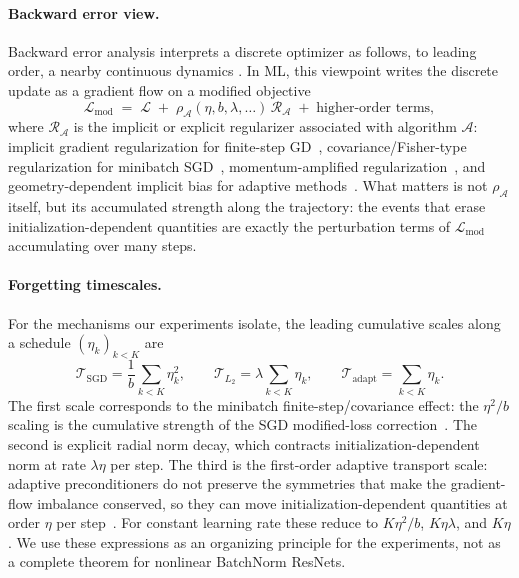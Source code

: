 \documentclass{article}
\begin{document}
\paragraph{Backward error view.}
Backward error analysis interprets a discrete optimizer as follows, to
leading order, a nearby continuous dynamics
\citep{griffiths1986scope,hairer2006geometric}.  In ML, this viewpoint writes
the discrete update as a gradient flow on a modified objective
\[
    \mathcal L_{\mathrm{mod}}
    \;=\;
    \mathcal L
    \;+\;
    \rho_{\mathcal A}(\eta,b,\lambda,\ldots)\,
    \mathcal R_{\mathcal A}
    \;+\;
    \text{higher-order terms},
\]
where $\mathcal R_{\mathcal A}$ is the implicit or explicit regularizer
associated with algorithm $\mathcal A$: implicit gradient regularization for
finite-step GD~\citep{barrett2021implicit}, covariance/Fisher-type
regularization for minibatch
SGD~\citep{smith2021origin,beneventano2023trajectories},
momentum-amplified regularization~\citep{ghosh2023implicit}, and
geometry-dependent implicit bias for adaptive
methods~\citep{cattaneo2024implicit}.  What matters is not
$\rho_{\mathcal A}$ itself, but its accumulated strength along the trajectory: the events that erase initialization-dependent quantities are exactly the
perturbation terms of $\mathcal L_{\mathrm{mod}}$ accumulating over many
steps.


\paragraph{Forgetting timescales.}
For the mechanisms our experiments isolate, the leading cumulative scales
along a schedule $(\eta_k)_{k<K}$ are
\[
    \mathcal T_{\mathrm{SGD}}
    =
    \frac{1}{b}\sum_{k<K}\eta_k^2,
    \qquad
    \mathcal T_{L_2}
    =
    \lambda\sum_{k<K}\eta_k,
    \qquad
    \mathcal T_{\mathrm{adapt}}
    =
    \sum_{k<K}\eta_k.
\]
The first scale corresponds to the minibatch finite-step/covariance effect: the $\eta^2/b$ scaling is the cumulative strength of the SGD modified-loss correction~\citep{smith2021origin,beneventano2023trajectories}.  The second
is explicit radial norm decay, which contracts initialization-dependent norm
at rate $\lambda\eta$ per step.  The third is the first-order adaptive
transport scale: adaptive preconditioners do not preserve the symmetries that
make the gradient-flow imbalance conserved, so they can move
initialization-dependent quantities at order $\eta$ per
step~\citep{cattaneo2024implicit}.  For constant learning rate these reduce
to $K\eta^2/b$, $K\eta\lambda$, and $K\eta$.  We use these expressions as
an organizing principle for the experiments, not as a complete theorem for
nonlinear BatchNorm ResNets.
\end{document}

